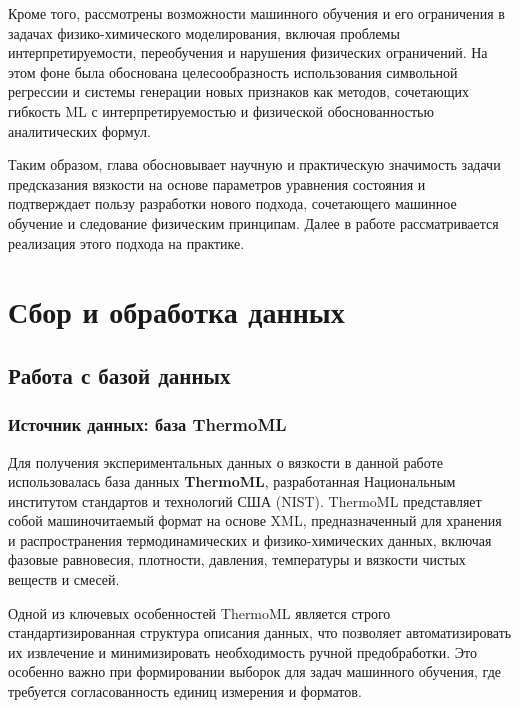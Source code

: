 \documentclass[a4paper,12pt]{article}
\begin{document}
Кроме того, рассмотрены возможности машинного обучения и его ограничения в задачах физико-химического моделирования, включая проблемы интерпретируемости, переобучения и нарушения физических ограничений. На этом фоне была обоснована целесообразность использования символьной регрессии и системы генерации новых признаков как методов, сочетающих гибкость ML с интерпретируемостью и физической обоснованностью аналитических формул.

Таким образом, глава обосновывает научную и практическую значимость задачи предсказания вязкости на основе параметров уравнения состояния и подтверждает пользу разработки нового подхода, сочетающего машинное обучение и следование физическим принципам. Далее в работе рассматривается реализация этого подхода на практике.

\newpage

\section{Сбор и обработка данных}
  \subsection{Работа с базой данных}
    \subsubsection{Источник данных: база ThermoML}
    
      Для получения экспериментальных данных о вязкости в данной работе использовалась база данных \textbf{ThermoML}, разработанная Национальным институтом стандартов и технологий США (NIST). ThermoML представляет собой машиночитаемый формат на основе XML, предназначенный для хранения и распространения термодинамических и физико-химических данных, включая фазовые равновесия, плотности, давления, температуры и вязкости чистых веществ и смесей.
      
      Одной из ключевых особенностей ThermoML является строго стандартизированная структура описания данных, что позволяет автоматизировать их извлечение и минимизировать необходимость ручной предобработки. Это особенно важно при формировании выборок для задач машинного обучения, где требуется согласованность единиц измерения и форматов.
      
\end{document}

